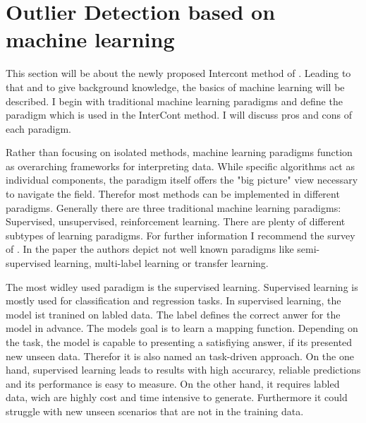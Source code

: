 \section{Outlier Detection based on machine learning}


This section will be about the newly proposed Intercont method of \citep{shenkar2022anomaly}. 
Leading to that and to give background knowledge, the basics of machine learning will be described.
I begin with traditional machine learning paradigms and define the paradigm which is used in the InterCont method.
I will discuss pros and cons of each paradigm.



Rather than focusing on isolated methods, machine learning paradigms function as overarching frameworks for interpreting data. 
While specific algorithms act as individual components, the paradigm itself offers the "big picture" view necessary to navigate the field.
Therefor most methods can be implemented in different paradigms.
Generally there are three traditional machine learning paradigms:
Supervised, unsupervised, reinforcement learning.   
There are plenty of different subtypes of learning paradigms. 
For further information I recommend the survey of \citet{sarker2021machine}.
In the paper the authors depict not well known paradigms like semi-supervised learning, multi-label learning or transfer learning.


The most widley used paradigm is the supervised learning. 
Supervised learning is mostly used for classification and regression tasks.
In supervised learning, the model ist tranined on labled data. 
The label defines the correct anwer for the model in advance.
The models goal is to learn a mapping function.
Depending on the task, the model is capable to presenting a satisfiying answer, if its presented new unseen data.
Therefor it is also named an task-driven approach. \citep[p.3]{sarker2021machine}
On the one hand, supervised learning leads to results with high accurarcy, reliable predictions and its performance is easy to measure.
On the other hand, it requires labled data, wich are highly cost and time intensive to generate.
Furthermore it could struggle with new unseen scenarios that are not in the training data.


